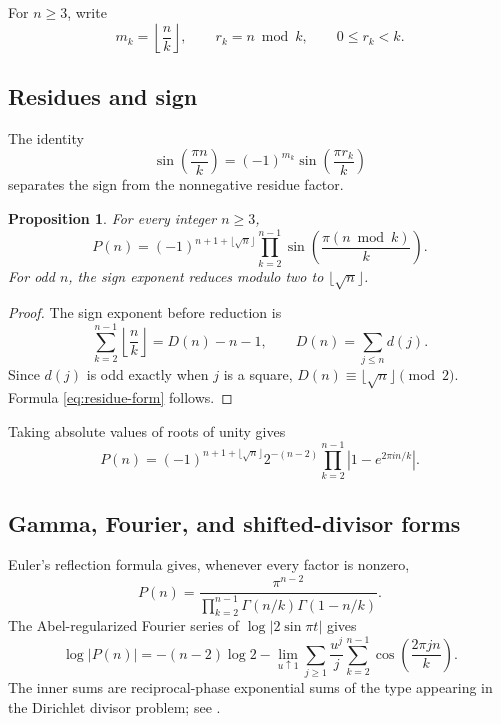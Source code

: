 \documentclass[11pt]{amsart}
\numberwithin{equation}{section}
\newtheorem{proposition}[theorem]{Proposition}
\theoremstyle{definition}
\theoremstyle{remark}
\begin{document}
For \(n\geq3\), write
\begin{equation}\label{eq:quotient-residue}
 m_k=\left\lfloor\frac nk\right\rfloor,
 \qquad r_k=n\bmod k,
 \qquad 0\leq r_k<k.
\end{equation}

\subsection{Residues and sign}

The identity
\begin{equation}\label{eq:sine-residue}
 \sin\!\left(\frac{\pi n}{k}\right)
 =(-1)^{m_k}\sin\!\left(\frac{\pi r_k}{k}\right)
\end{equation}
separates the sign from the nonnegative residue factor.

\begin{proposition}\label{prop:residue-sign}
For every integer \(n\geq3\),
\begin{equation}\label{eq:residue-form}
 P(n)=(-1)^{n+1+\lfloor\sqrt n\rfloor}
 \prod_{k=2}^{n-1}\sin\!\left(\frac{\pi(n\bmod k)}{k}\right).
\end{equation}
For odd \(n\), the sign exponent reduces modulo two to
\(\lfloor\sqrt n\rfloor\).
\end{proposition}

\begin{proof}
The sign exponent before reduction is
\[
 \sum_{k=2}^{n-1}\left\lfloor\frac nk\right\rfloor=D(n)-n-1,
 \qquad D(n)=\sum_{j\leq n}d(j).
\]
Since \(d(j)\) is odd exactly when \(j\) is a square,
\(D(n)\equiv\lfloor\sqrt n\rfloor\pmod2\).  Formula
\eqref{eq:residue-form} follows.
\end{proof}

Taking absolute values of roots of unity gives
\begin{equation}\label{eq:finite-root-form}
 P(n)=(-1)^{n+1+\lfloor\sqrt n\rfloor}2^{-(n-2)}
 \prod_{k=2}^{n-1}\left|1-e^{2\pi i n/k}\right|.
\end{equation}

\subsection{Gamma, Fourier, and shifted-divisor forms}

Euler's reflection formula gives, whenever every factor is nonzero,
\begin{equation}\label{eq:gamma-form}
 P(n)=\frac{\pi^{n-2}}
 {\displaystyle\prod_{k=2}^{n-1}\Gamma(n/k)\Gamma(1-n/k)}.
\end{equation}
The Abel-regularized Fourier series of \(\log|2\sin\pi t|\) gives
\begin{equation}\label{eq:fourier-form}
 \log|P(n)|=-(n-2)\log2
 -\lim_{u\uparrow1}\sum_{j\geq1}\frac{u^j}{j}
 \sum_{k=2}^{n-1}\cos\!\left(\frac{2\pi jn}{k}\right).
\end{equation}
The inner sums are reciprocal-phase exponential sums of the type appearing
in the Dirichlet divisor problem; see \cite{GrahamKolesnik1991}.
\end{document}
